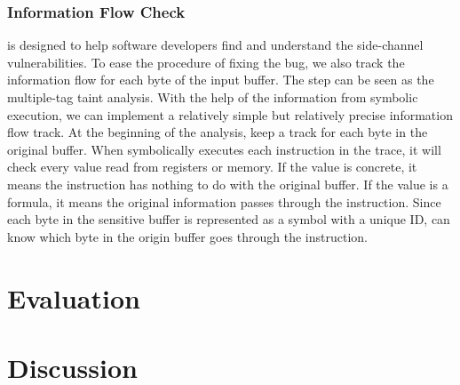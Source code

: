 \subsubsection{Information Flow Check}
\tool{} is designed to help software developers find and understand the side-channel vulnerabilities. To ease the procedure of fixing the bug, we also track the information flow for each byte of the input
buffer. 
The step can be seen as the multiple-tag taint analysis. With the help of the information from symbolic execution, we can implement a relatively simple but relatively precise information flow track.
At the beginning of the analysis, \tool{} keep a track for each byte in 
the original buffer. When \tool{} symbolically executes each instruction in the trace, it will check every value read from registers or memory. If the value is concrete, it means the instruction has nothing to do with the original buffer.
If the value is a formula, it means the original information passes through the instruction. Since each byte in the sensitive buffer is represented as a symbol with a unique ID, \tool{} can know which byte in the origin buffer goes through the instruction.

\section{Evaluation}

\section{Discussion}

